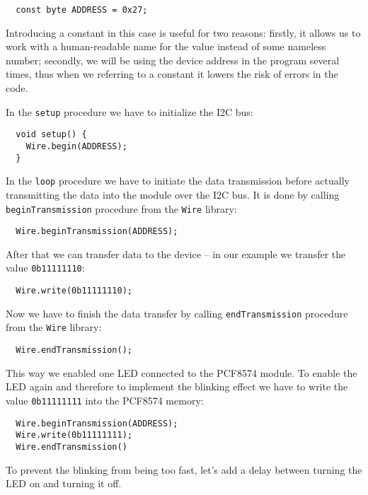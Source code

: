 \documentclass[../sparc.tex]{subfiles}
\begin{document}
\begin{verbatim}
  const byte ADDRESS = 0x27;
\end{verbatim}

Introducing a constant in this case is useful for two reasons: firstly, it
allows us to work with a human-readable name for the value instead of some
nameless number; secondly, we will be using the device address in the program
several times, thus when we referring to a constant it lowers the risk of errors
in the code.

In the \texttt{setup} procedure we have to initialize the I2C bus:

\begin{verbatim}
  void setup() {
    Wire.begin(ADDRESS);
  }
\end{verbatim}

In the \texttt{loop} procedure we have to initiate the data transmission before
actually transmitting the data into the module over the I2C bus.  It is done by
calling \texttt{beginTransmission} procedure from the \texttt{Wire} library:

\begin{verbatim}
  Wire.beginTransmission(ADDRESS);
\end{verbatim}

After that we can transfer data to the device -- in our example we transfer the
value \texttt{0b11111110}:

\begin{verbatim}
  Wire.write(0b11111110);
\end{verbatim}

Now we have to finish the data transfer by calling \texttt{endTransmission}
procedure from the \texttt{Wire} library:

\begin{verbatim}
  Wire.endTransmission();
\end{verbatim}

This way we enabled one LED connected to the PCF8574 module.  To enable the LED
again and therefore to implement the blinking effect we have to write the value
\texttt{0b11111111} into the PCF8574 memory:

\begin{verbatim}
  Wire.beginTransmission(ADDRESS);
  Wire.write(0b11111111);
  Wire.endTransmission()
\end{verbatim}

To prevent the blinking from being too fast, let's add a delay between turning
the LED on and turning it off.
\end{document}

